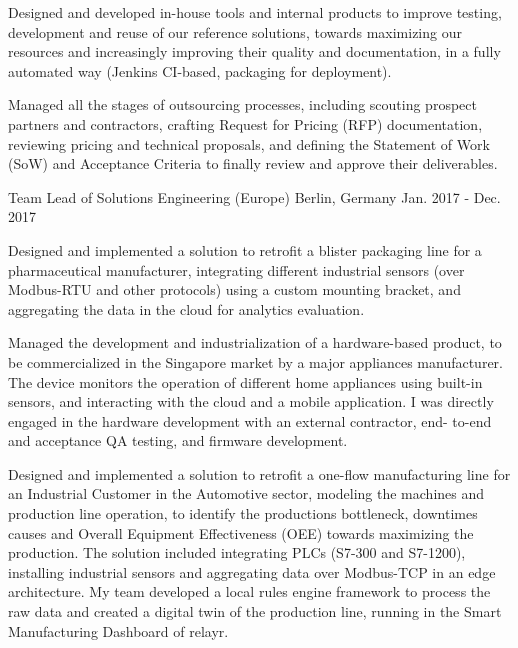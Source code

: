 \begin{cventries}
{\begin{cvitems}
        \item {Designed and developed in-house tools and internal products to improve testing, development and reuse of our reference solutions, towards maximizing our resources and increasingly improving their quality and documentation, in a fully automated way (Jenkins CI-based, packaging for deployment).}
        \item {Managed all the stages of outsourcing processes, including scouting prospect partners and contractors, crafting Request for Pricing (RFP) documentation, reviewing pricing and technical proposals, and defining the Statement of Work (SoW) and Acceptance Criteria to finally review and approve their deliverables.}
      \end{cvitems}
    }

  \cventry
    {Team Lead of Solutions Engineering (Europe)} %
    {} %
    {Berlin, Germany} %
    {Jan. 2017 - Dec. 2017} %
    {
      \begin{cvitems} %
        \item {Designed and implemented a solution to retrofit a blister packaging line for a pharmaceutical manufacturer, integrating different industrial sensors (over Modbus-RTU and other protocols) using a custom mounting bracket, and aggregating the data in the cloud for analytics evaluation.}
        \item {Managed the development and industrialization of a hardware-based product, to be commercialized in the Singapore market by a major appliances manufacturer. The device monitors the operation of different home appliances using built-in sensors, and interacting with the cloud and a mobile application. I was directly engaged in the hardware development with an external contractor, end- to-end and acceptance QA testing, and firmware development.}
        \item {Designed and implemented a solution to retrofit a one-flow manufacturing line for an Industrial Customer in the Automotive sector, modeling the machines and production line operation, to identify the productions bottleneck, downtimes causes and Overall Equipment Effectiveness (OEE) towards maximizing the production. The solution included integrating  PLCs (S7-300 and S7-1200), installing industrial sensors and aggregating data over Modbus-TCP in an edge architecture.  My team developed a local rules engine framework to process the raw data and created a digital twin of the production line, running in the Smart Manufacturing Dashboard of relayr.}

\end{cvitems}}
\end{cventries}
